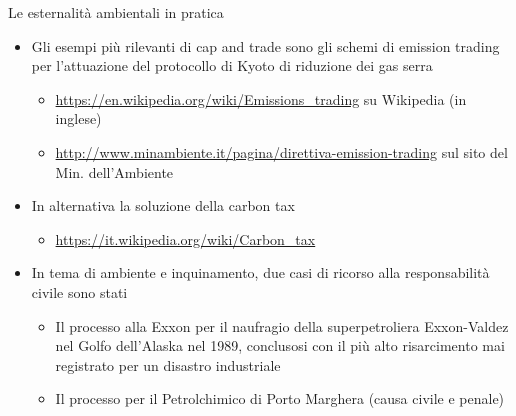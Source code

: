 \documentclass[aspectratio=64,12pt]{beamer}
\begin{document}
\begin{frame}{Le esternalità ambientali in pratica}
\begin{itemize}
\item Gli esempi più rilevanti di \alert{cap and trade} sono gli schemi di
\alert{emission trading} per l'attuazione del protocollo di Kyoto di riduzione
dei gas serra
\begin{itemize}
\item \url{https://en.wikipedia.org/wiki/Emissions\_trading} su Wikipedia (in
inglese)
\item \url{http://www.minambiente.it/pagina/direttiva-emission-trading} sul
sito del Min. dell'Ambiente
\end{itemize}
\item In alternativa la soluzione della \alert{carbon tax}
\begin{itemize}
\item \url{https://it.wikipedia.org/wiki/Carbon\_tax}
\end{itemize}
\item In tema di ambiente e inquinamento, due casi di ricorso alla
responsabilità civile sono stati
\begin{itemize}
\item Il processo alla Exxon per il naufragio della superpetroliera
Exxon-Valdez nel Golfo dell'Alaska nel 1989, conclusosi con il più alto
risarcimento mai registrato per un disastro industriale
\item Il processo per il Petrolchimico di Porto Marghera (causa civile e
penale)
\end{itemize}
\end{itemize}
\end{frame}
\end{document}
